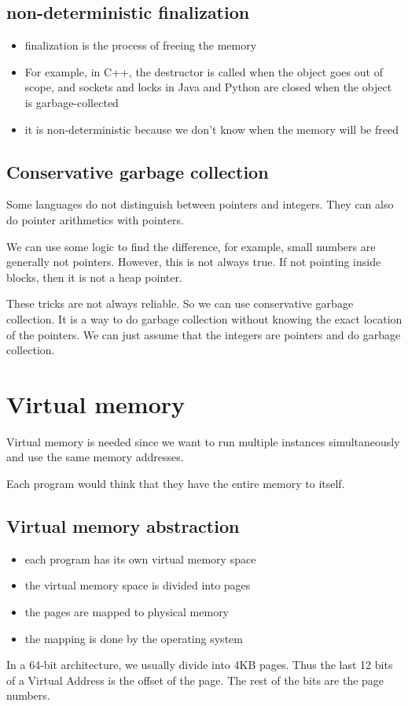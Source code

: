 \documentclass[letterpaper,12pt]{article}
\begin{document}
\subsection{non-deterministic finalization}
\begin{itemize}
    \item finalization is the process of freeing the memory
    \item For example, in C++, the destructor is called when the object goes out of
          scope, and sockets and locks in Java and Python are closed when the object is
          garbage-collected
    \item it is non-deterministic because we don't know when the memory will be freed
\end{itemize}
\subsection{Conservative garbage collection}
Some languages do not distinguish between pointers and integers. They can also
do pointer arithmetics with pointers.

We can use some logic to find the difference, for example, small numbers are
generally not pointers. However, this is not always true. If not pointing
inside blocks, then it is not a heap pointer.

These tricks are not always reliable. So we can use conservative garbage
collection. It is a way to do garbage collection without knowing the exact
location of the pointers. We can just assume that the integers are pointers and
do garbage collection.
\section{Virtual memory}
Virtual memory is needed since we want to run multiple instances simultaneously
and use the same memory addresses.

Each program would think that they have the entire memory to itself.
\subsection{Virtual memory abstraction}
\begin{itemize}
    \item each program has its own virtual memory space
    \item the virtual memory space is divided into pages
    \item the pages are mapped to physical memory
    \item the mapping is done by the operating system
\end{itemize}
In a 64-bit architecture, we usually divide into 4KB pages. Thus the last 12 bits of a Virtual Address is the offset of the page. The rest of the bits are the page numbers.
\end{document}
